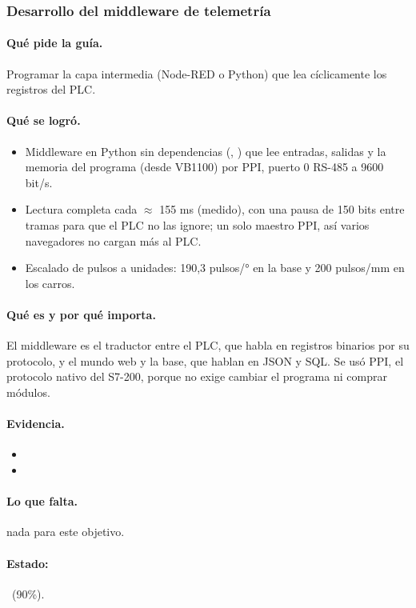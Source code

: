 \documentclass[a4paper,11pt]{article}
\begin{document}
\subsubsection{Desarrollo del middleware de telemetría}
\paragraph{Qué pide la guía.} Programar la capa intermedia (Node-RED o Python) que lea cíclicamente los registros del PLC.
\paragraph{Qué se logró.}
\begin{itemize}
\item Middleware en Python sin dependencias (, ) que lee entradas, salidas y la memoria del programa (desde VB1100) por PPI, puerto 0 RS-485 a 9600 bit/s.
\item Lectura completa cada $\approx$ 155 ms (medido), con una pausa de 150 bits entre tramas para que el PLC no las ignore; un solo maestro PPI, así varios navegadores no cargan más al PLC.
\item Escalado de pulsos a unidades: 190,3 pulsos/° en la base y 200 pulsos/mm en los carros.
\end{itemize}
\paragraph{Qué es y por qué importa.} El middleware es el traductor entre el PLC, que habla en registros binarios por su protocolo, y el mundo web y la base, que hablan en JSON y SQL. Se usó PPI, el protocolo nativo del S7-200, porque no exige cambiar el programa ni comprar módulos.
\paragraph{Evidencia.}
\begin{itemize}\small
\item {}
\item {}
\end{itemize}
\paragraph{Lo que falta.} nada para este objetivo.
\paragraph{Estado:} \parcial~(90\%).
\end{document}
